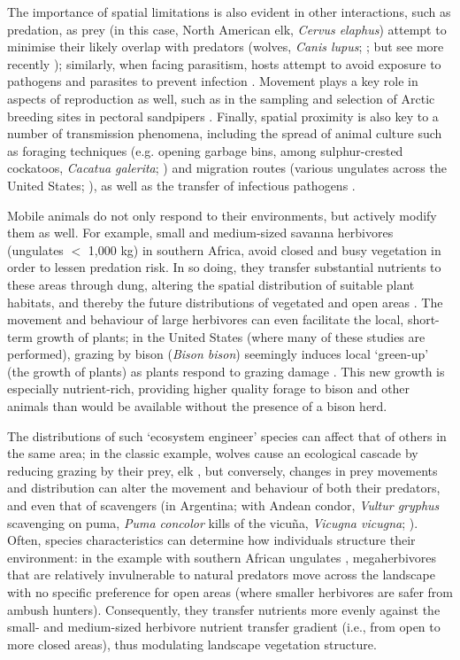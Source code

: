 The importance of spatial limitations is also evident in other interactions, such as predation, as prey (in this case, North American elk, \emph{Cervus elaphus}) attempt to minimise their likely overlap with predators (wolves, \emph{Canis lupus}; \cite{fortin2005}; but see more recently \cite{kohl2018}); similarly, when facing parasitism, hosts attempt to avoid exposure to pathogens and parasites to prevent infection \citep{weinstein2018}.
Movement plays a key role in aspects of reproduction as well, such as in the sampling and selection of Arctic breeding sites in pectoral sandpipers \parencite[\emph{Calidris melanotos};][]{kempenaers2017}.
Finally, spatial proximity is also key to a number of transmission phenomena, including the spread of animal culture such as foraging techniques (e.g. opening garbage bins, among sulphur-crested cockatoos, \emph{Cacatua galerita}; \cite{klump2021}) and migration routes (various ungulates across the United States; \cite{jesmer2018}), as well as the transfer of infectious pathogens \citep[][see also Chapter~\ref{ch:pathomove}]{weinstein2018,monk2022,stroeymeyt2018}.

Mobile animals do not only respond to their environments, but actively modify them as well.
For example, small and medium-sized savanna herbivores (ungulates $<$ 1,000 kg) in southern Africa, avoid closed and busy vegetation in order to lessen predation risk.
In so doing, they transfer substantial nutrients to these areas through dung, altering the spatial distribution of suitable plant habitats, and thereby the future distributions of vegetated and open areas \parencite{leroux2018}.
The movement and behaviour of large herbivores can even facilitate the local, short-term growth of plants; in the United States (where many of these studies are performed), grazing by bison (\emph{Bison bison}) seemingly induces local `green-up' (the growth of plants) as plants respond to grazing damage \parencite{geremia2019}.
This new growth is especially nutrient-rich, providing higher quality forage to bison and other animals than would be available without the presence of a bison herd.

The distributions of such `ecosystem engineer' species can affect that of others in the same area; in the classic example, wolves cause an ecological cascade by reducing grazing by their prey, elk \parencite{fortin2005}, but conversely, changes in prey movements and distribution can alter the movement and behaviour of both their predators, and even that of scavengers (in Argentina; with Andean condor, \emph{Vultur gryphus} scavenging on puma, \emph{Puma concolor} kills of the vicu{\~n}a, \emph{Vicugna vicugna}; \cite{monk2022}).
Often, species characteristics can determine how individuals structure their environment: in the example with southern African ungulates \parencite{leroux2018}, megaherbivores that are relatively invulnerable to natural predators move across the landscape with no specific preference for open areas (where smaller herbivores are safer from ambush hunters).
Consequently, they transfer nutrients more evenly against the small- and medium-sized herbivore nutrient transfer gradient (i.e., from open to more closed areas), thus modulating landscape vegetation structure.

